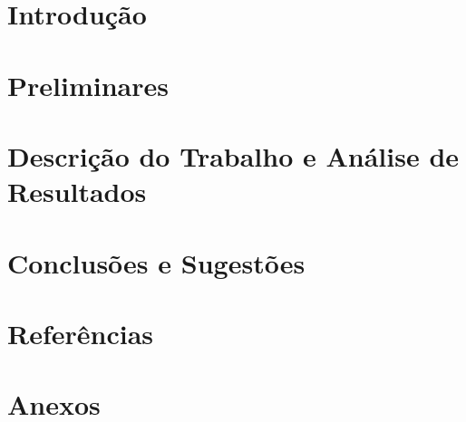 \documentclass[a4paper]{article}
\begin{document}
\begin{abstract}

\hspace{3mm} 

\end{abstract}

\pagebreak
\tableofcontents

\pagebreak

\section{Introdução}


\section{Preliminares}


\section{Descrição do Trabalho e Análise de Resultados}


\section{Conclusões e Sugestões}


\section{Referências}


\section{Anexos}
\end{document}

